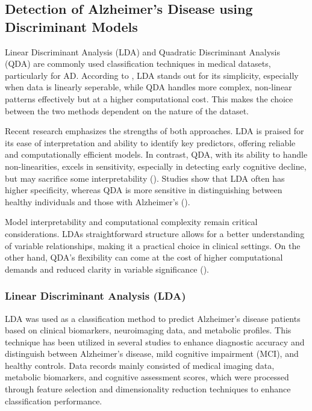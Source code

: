 \documentclass[12pt]{article}
\begin{document}
\subsection{Detection of Alzheimer's Disease using Discriminant Models}
\noindent

Linear Discriminant Analysis (LDA) and Quadratic Discriminant Analysis (QDA) are commonly used classification techniques in medical datasets, particularly for AD. According to \cite{jain2022}, LDA stands out for its simplicity, especially when data is linearly seperable, while QDA
handles more complex, non-linear patterns effectively but at a higher computational cost. This makes the choice between the two methods dependent on the nature of the dataset.

Recent research emphasizes the strengths of both approaches. LDA is praised for its ease of interpretation and ability to identify key predictors, offering reliable and computationally efficient models. In contrast, QDA, with its ability to handle non-linearities, excels in sensitivity, especially in
detecting early cognitive decline, but may sacrifice some interpretability (\cite{arbabshirani2017}). Studies show that LDA often has higher specificity, whereas QDA is more sensitive in distinguishing between healthy individuals and those with Alzheimer's (\cite{nguyen2020}).

Model interpretability and computational complexity remain critical considerations. LDAs straightforward structure allows for a better understanding of variable relationships, making it a practical choice in clinical settings. On the other hand, QDA's flexibility can come at the cost of higher
computational demands and reduced clarity in variable significance (\cite{wang2018}).

\subsubsection{Linear Discriminant Analysis (LDA)}
\noindent
LDA was used as a classification method to predict Alzheimer's disease patients based on clinical biomarkers, neuroimaging data, and metabolic profiles. This technique has been utilized in several studies to enhance diagnostic accuracy and distinguish between Alzheimer's disease, mild cognitive impairment
(MCI), and healthy controls. Data records mainly consisted of medical imaging data, metabolic biomarkers, and cognitive assessment scores, which were processed through feature selection and dimensionality reduction techniques to enhance classification performance.
\end{document}

